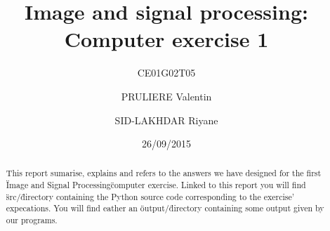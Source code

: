 \documentclass[a4paper,10pt]{article}
\title{Image and signal processing: Computer exercise 1}
\subtitle{CE01G02T05}
\author{PRULIERE Valentin \and SID-LAKHDAR Riyane}
\date{26/09/2015}
\begin{document}


\maketitle


\begin{abstract}
  This report sumarise, explains and refers to the answers we have designed for the first \"Image and Signal Processing\" computer exercise.\newline 
  Linked to this report you will find \"src/\" directory containing the Python source code corresponding to the exercise' expecations.  
  You will find eather an \"output/\" directory containing some output given by our programs.\newline
\end{abstract}

\end{document}
